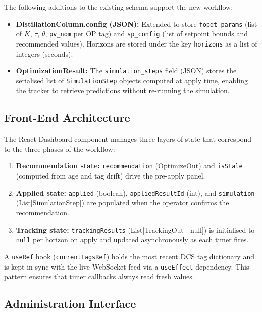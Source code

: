 The following additions to the existing schema support the new workflow:

\begin{itemize}
  \item \textbf{DistillationColumn.config (JSON):}  Extended to store
        \texttt{fopdt\_params} (list of $K$, $\tau$, $\theta$,
        \texttt{pv\_nom} per OP tag) and \texttt{sp\_config} (list of
        setpoint bounds and recommended values).  Horizons are stored under
        the key \texttt{horizons} as a list of integers (seconds).
  \item \textbf{OptimizationResult:}  The \texttt{simulation\_steps}
        field (JSON) stores the serialised list of \texttt{SimulationStep}
        objects computed at apply time, enabling the tracker to retrieve
        predictions without re-running the simulation.
\end{itemize}

\subsection{Front-End Architecture}

The React Dashboard component manages three layers of state that correspond
to the three phases of the workflow:

\begin{enumerate}
  \item \textbf{Recommendation state:}  \texttt{recommendation} (OptimizeOut)
        and \texttt{isStale} (computed from age and tag drift) drive the
        pre-apply panel.
  \item \textbf{Applied state:}  \texttt{applied} (boolean),
        \texttt{appliedResultId} (int), and \texttt{simulation}
        (List[SimulationStep]) are populated when the operator confirms
        the recommendation.
  \item \textbf{Tracking state:}  \texttt{trackingResults}
        (List[TrackingOut | null]) is initialised to \texttt{null} per
        horizon on apply and updated asynchronously as each timer fires.
\end{enumerate}

A \texttt{useRef} hook (\texttt{currentTagsRef}) holds the most recent
DCS tag dictionary and is kept in sync with the live WebSocket feed via a
\texttt{useEffect} dependency.  This pattern ensures that timer callbacks
always read fresh values.

\subsection{Administration Interface}

